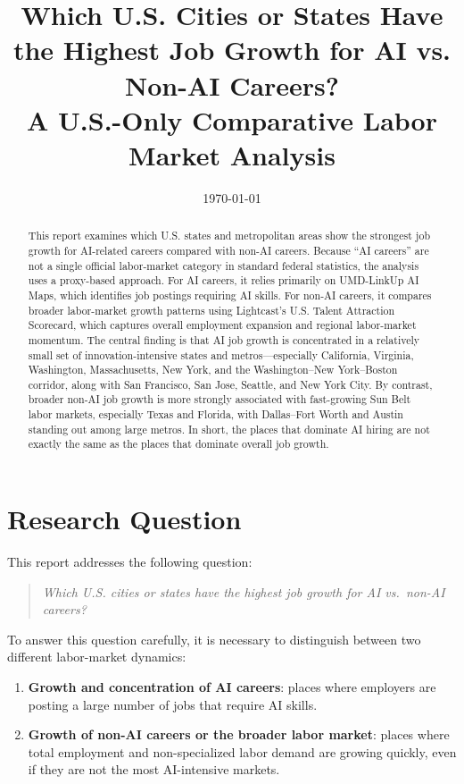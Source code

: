 \documentclass[12pt,a4paper]{article}
\title{\textbf{Which U.S. Cities or States Have the Highest Job Growth for AI vs. Non-AI Careers?}\\
\large A U.S.-Only Comparative Labor Market Analysis}
\author{}
\date{\today}
\begin{document}
\maketitle

\begin{abstract}
This report examines which U.S. states and metropolitan areas show the strongest job growth for AI-related careers compared with non-AI careers. Because ``AI careers'' are not a single official labor-market category in standard federal statistics, the analysis uses a proxy-based approach. For AI careers, it relies primarily on UMD-LinkUp AI Maps, which identifies job postings requiring AI skills. For non-AI careers, it compares broader labor-market growth patterns using Lightcast's U.S. Talent Attraction Scorecard, which captures overall employment expansion and regional labor-market momentum. The central finding is that AI job growth is concentrated in a relatively small set of innovation-intensive states and metros---especially California, Virginia, Washington, Massachusetts, New York, and the Washington--New York--Boston corridor, along with San Francisco, San Jose, Seattle, and New York City. By contrast, broader non-AI job growth is more strongly associated with fast-growing Sun Belt labor markets, especially Texas and Florida, with Dallas--Fort Worth and Austin standing out among large metros. In short, the places that dominate AI hiring are not exactly the same as the places that dominate overall job growth.
\end{abstract}

\section{Research Question}

This report addresses the following question:

\begin{quote}
\textit{Which U.S. cities or states have the highest job growth for AI vs.\ non-AI careers?}
\end{quote}

To answer this question carefully, it is necessary to distinguish between two different labor-market dynamics:

\begin{enumerate}[label=\arabic*.]
    \item \textbf{Growth and concentration of AI careers}: places where employers are posting a large number of jobs that require AI skills.
    \item \textbf{Growth of non-AI careers or the broader labor market}: places where total employment and non-specialized labor demand are growing quickly, even if they are not the most AI-intensive markets.
\end{enumerate}
\end{document}
